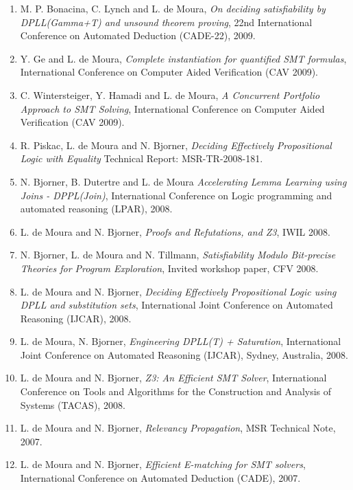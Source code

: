 \documentclass{article}
\begin{document}
\begin{enumerate}
\item M. P. Bonacina, C. Lynch and L. de Moura,
{\em On deciding satisfiability by DPLL(Gamma+T) and unsound theorem proving},
22nd International Conference on Automated Deduction (CADE-22), 2009.

\item Y. Ge and L. de Moura,
{\em Complete instantiation for quantified SMT formulas},
International Conference on Computer Aided Verification (CAV 2009).

\item C. Wintersteiger, Y. Hamadi and L. de Moura,
{\em A Concurrent Portfolio Approach to SMT Solving},
International Conference on Computer Aided Verification (CAV 2009).

\item R. Piskac, L. de Moura and N. Bjorner,
{\em Deciding Effectively Propositional Logic with Equality}
Technical Report: MSR-TR-2008-181.

\item N. Bjorner, B. Dutertre and L. de Moura
{\em Accelerating Lemma Learning using Joins - DPPL(Join)},
International Conference on Logic programming and automated reasoning (LPAR), 2008.

\item L. de Moura and  N. Bjorner,
{\em Proofs and Refutations, and Z3},
IWIL 2008.

\item N. Bjorner, L. de Moura and N. Tillmann,
{\em Satisfiability Modulo Bit-precise Theories for Program Exploration},
Invited workshop paper, CFV 2008.

\item L. de Moura and N. Bjorner,
{\em Deciding Effectively Propositional Logic using DPLL and substitution sets},
International Joint Conference on Automated Reasoning (IJCAR), 2008.

\item L. de Moura, N. Bjorner,
{\em Engineering DPLL(T) + Saturation},
International Joint Conference on Automated Reasoning (IJCAR), Sydney, Australia, 2008.

\item L. de Moura and N. Bjorner,
{\em Z3: An Efficient SMT Solver},
International Conference on Tools and Algorithms for the Construction and Analysis of Systems (TACAS), 2008.

\item L. de Moura and N. Bjorner, {\em Relevancy Propagation}, MSR Technical Note, 2007.

\item L. de Moura and N. Bjorner, {\em Efficient E-matching for SMT solvers}, International Conference on Automated Deduction (CADE), 2007.


\end{enumerate}
\end{document}
